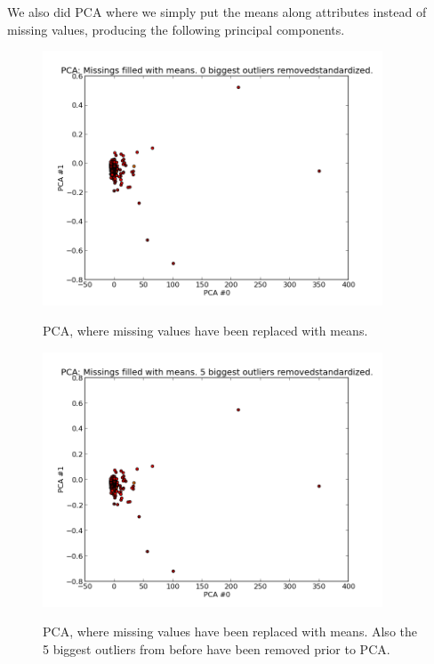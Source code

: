 We also did PCA where we simply put the means along attributes instead of missing values, producing the following principal components.

\begin{figure}[H]
\centering
\includegraphics[width=0.9\textwidth]{pca/missings-filled-w-means_0-biggest-outliers-removed_standrd_}
\label{fig:prenorm_attrrem_0out}
\caption{PCA, where missing values have been replaced with means.}
\end{figure}
\begin{figure}[H]
\centering
\includegraphics[width=0.9\textwidth]{pca/missings-filled-w-means_5-biggest-outliers-removed_standrd_}
\label{fig:prenorm_attrrem_0out}
\caption{PCA, where missing values have been replaced with means. Also the 5 biggest outliers from before have been removed prior to PCA.}
\end{figure}


